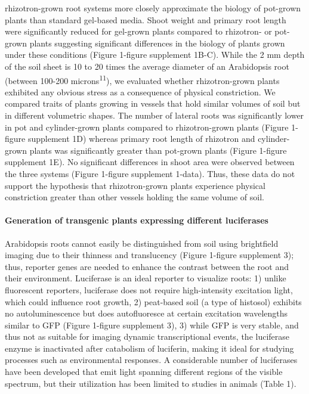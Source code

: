 \documentclass[]{article}
\begin{document}
rhizotron-grown root systems more closely approximate the biology of
pot-grown plants than standard gel-based media. Shoot weight and primary
root length were significantly reduced for gel-grown plants compared to
rhizotron- or pot-grown plants suggesting significant differences in the
biology of plants grown under these conditions (Figure 1-figure
supplement 1B-C). While the 2 mm depth of the soil sheet is 10 to 20
times the average diameter of an Arabidopsis root (between 100-200
microns\textsuperscript{11}), we evaluated whether rhizotron-grown
plants exhibited any obvious stress as a consequence of physical
constriction. We compared traits of plants growing in vessels that hold
similar volumes of soil but in different volumetric shapes. The number
of lateral roots was significantly lower in pot and cylinder-grown
plants compared to rhizotron-grown plants (Figure 1-figure supplement
1D) whereas primary root length of rhizotron and cylinder-grown plants
was significantly greater than pot-grown plants (Figure 1-figure
supplement 1E). No significant differences in shoot area were observed
between the three systems (Figure 1-figure supplement 1-data). Thus,
these data do not support the hypothesis that rhizotron-grown plants
experience physical constriction greater than other vessels holding the
same volume of soil.

\paragraph{Generation of transgenic plants expressing different
luciferases}\label{generation-of-transgenic-plants-expressing-different-luciferases}

Arabidopsis roots cannot easily be distinguished from soil using
brightfield imaging due to their thinness and translucency (Figure
1-figure supplement 3); thus, reporter genes are needed to enhance the
contrast between the root and their environment. Luciferase is an ideal
reporter to visualize roots: 1) unlike fluorescent reporters, luciferase
does not require high-intensity excitation light, which could influence
root growth, 2) peat-based soil (a type of histosol) exhibits no
autoluminescence but does autofluoresce at certain excitation
wavelengths similar to GFP (Figure 1-figure supplement 3), 3) while GFP
is very stable, and thus not as suitable for imaging dynamic
transcriptional events, the luciferase enzyme is inactivated after
catabolism of luciferin, making it ideal for studying processes such as
environmental responses. A considerable number of luciferases have been
developed that emit light spanning different regions of the visible
spectrum, but their utilization has been limited to studies in animals
(Table 1).
\end{document}
